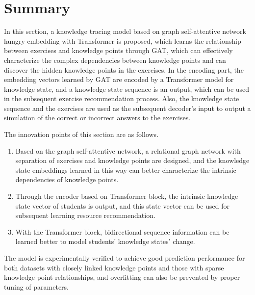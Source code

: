 \section{Summary}
%
In this section, a knowledge tracing model based on graph self-attentive network hungry embedding with Transformer is proposed, which learns the relationship between exercises and knowledge points through GAT, which can effectively characterize the complex dependencies between knowledge points and can discover the hidden knowledge points in the exercises. In the encoding part, the embedding vectors learned by GAT are encoded by a Transformer model for knowledge state, and a knowledge state sequence is an output, which can be used in the subsequent exercise recommendation process. Also, the knowledge state sequence and the exercises are used as the subsequent decoder's input to output a simulation of the correct or incorrect answers to the exercises.

The innovation points of this section are as follows.
\begin{enumerate}
	\item Based on the graph self-attentive network, a relational graph network with separation of exercises and knowledge points are designed, and the knowledge state embeddings learned in this way can better characterize the intrinsic dependencies of knowledge points.
	\item Through the encoder based on Transformer block, the intrinsic knowledge state vector of students is output, and this state vector can be used for subsequent learning resource recommendation.
	\item With the Transformer block, bidirectional sequence information can be learned better to model students' knowledge states' change.
\end{enumerate}

The model is experimentally verified to achieve good prediction performance for both datasets with closely linked knowledge points and those with sparse knowledge point relationships, and overfitting can also be prevented by proper tuning of parameters.